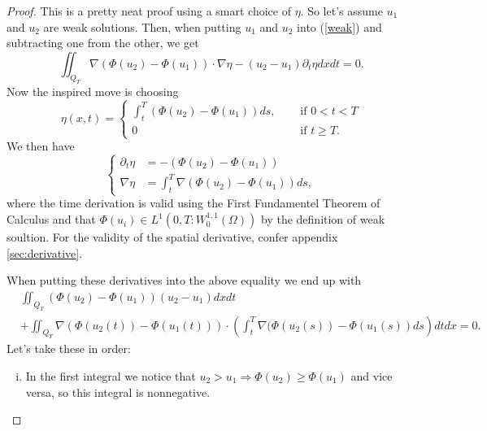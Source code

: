 \documentclass[11pt, a4paper]{article}
\begin{document}
\begin{proof}
This is a pretty neat proof using a smart choice of $\eta$. So let's assume $u_1$ and $u_2$ are weak solutions. Then, when putting $u_1$ and $u_2$ into (\ref{weak}) and subtracting one from the other, we get
\begin{equation}
\label{weak_diff}
\iint_{Q_T}\nabla(\Phi(u_2) - \Phi(u_1)) \cdot \nabla \eta - (u_2 - u_1)\partial_t \eta dxdt = 0.
\end{equation}
Now the inspired move is choosing
\begin{equation*}
\eta(x,t) = \begin{cases}
		\int_t^T(\Phi(u_2) - \Phi(u_1))ds, \quad &\text{ if } 0 < t < T \\
		0 \quad &\text{ if } t\geq T.
	\end{cases}
\end{equation*}
We then have
\begin{equation*}
\begin{cases}
	\partial_t \eta &= -(\Phi(u_2) - \Phi(u_1) ) \\
	\nabla \eta &= \int_t^T\nabla (\Phi(u_2) - \Phi(u_1))ds,
\end{cases}
\end{equation*}
where the time derivation is valid using the First Fundamentel Theorem of Calculus and that $\Phi(u_i) \in L^1(0,T : W_0^{1,1}(\Omega))$ by the definition of weak soultion. For the validity of the spatial derivative, confer appendix \ref{sec:derivative}.

When putting these derivatives into the above equality we end up with
\begin{equation}
\label{unique}
\begin{aligned}
	&\iint_{Q_T}(\Phi(u_2) - \Phi(u_1))(u_2 - u_1)dxdt \\ 
	&+ \iint_{Q_T}\nabla(\Phi(u_2(t)) - \Phi(u_1(t))) \cdot \left(\int_t^T 					\nabla(\Phi(u_2(s)) - \Phi(u_1(s))ds\right)dtdx = 0.
\end{aligned}
\end{equation}
Let's take these in order:
\begin{enumerate}[i)]
	\item In the first integral we notice that $u_2 > u_1 \Rightarrow \Phi(u_2) \geq \Phi(u_1)$ and vice versa, so this integral is nonnegative.
	

\end{enumerate}
\end{proof}
\end{document}
